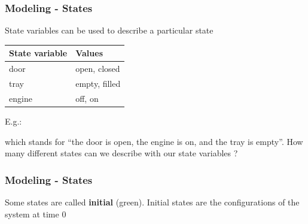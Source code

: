 \begin{frame}
  \frametitle{Modeling - States}

  State variables can be used to describe a particular state
  \vfill
  \begin{center}
  \begin{tabular}{ll}
    \hline
    State variable & Values \\
    \hline
    door           & open, closed \\
    tray           & empty, filled \\ 
    engine         & off, on \\
    \hline
  \end{tabular}
  \end{center}
  \vfill\pause
  E.g.:
  \begin{center}
  
  \end{center}
  which stands for ``the door is open, the engine is on, and the tray is empty''.\pause
  How many different states can we describe with our state variables ? 

\end{frame}

\begin{frame}
  \frametitle{Modeling - States}

  \begin{center}
  
  \end{center}

  Some states are called {\bf initial} (green). Initial states 
  are the configurations of the system at time $0$

\end{frame}

